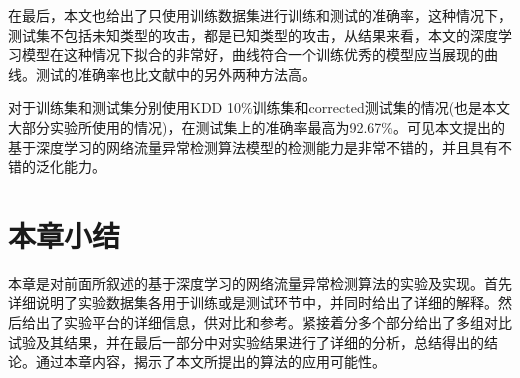 在最后，本文也给出了只使用训练数据集进行训练和测试的准确率，这种情况下，测试集不包括未知类型的攻击，都是已知类型的攻击，从结果来看，本文的深度学习模型在这种情况下拟合的非常好，曲线符合一个训练优秀的模型应当展现的曲线。测试的准确率也比文献中的另外两种方法高。

对于训练集和测试集分别使用KDD 10\%训练集和corrected测试集的情况(也是本文大部分实验所使用的情况)，在测试集上的准确率最高为92.67\%。可见本文提出的基于深度学习的网络流量异常检测算法模型的检测能力是非常不错的，并且具有不错的泛化能力。

\section{本章小结}

本章是对前面所叙述的基于深度学习的网络流量异常检测算法的实验及实现。首先详细说明了实验数据集各用于训练或是测试环节中，并同时给出了详细的解释。然后给出了实验平台的详细信息，供对比和参考。紧接着分多个部分给出了多组对比试验及其结果，并在最后一部分中对实验结果进行了详细的分析，总结得出的结论。通过本章内容，揭示了本文所提出的算法的应用可能性。